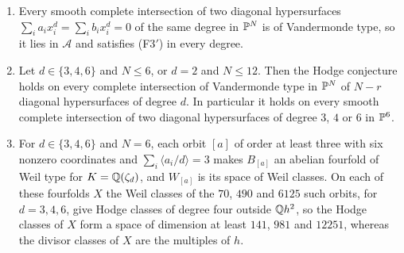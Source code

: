 \begin{corollary}\label{cor:twodiagonal}
\leavevmode
\begin{enumerate}[label=\textup{(\roman*)},leftmargin=2.6em,itemsep=2pt]
\item Every smooth complete intersection of two diagonal hypersurfaces
  $\sum_{i}a_{i}x_{i}^{d}=\sum_{i}b_{i}x_{i}^{d}=0$ of the same degree in
  $\mathbb{P}^{N}$ is of Vandermonde type, so it lies in $\mathcal{A}$ and
  satisfies \textup{(F3$'$)} in every degree.
\item Let $d\in\{3,4,6\}$ and $N\le6$, or $d=2$ and $N\le12$. Then the
  Hodge conjecture holds on every complete intersection of Vandermonde type
  in $\mathbb{P}^{N}$ of $N-r$ diagonal hypersurfaces of degree $d$. In particular
  it holds on every smooth complete intersection of two diagonal
  hypersurfaces of degree $3$, $4$ or $6$ in $\mathbb{P}^{6}$.
\item For $d\in\{3,4,6\}$ and $N=6$, each orbit $[a]$ of order at least
  three with six nonzero coordinates and $\sum_{i}\langle a_{i}/d\rangle=3$ makes $B_{[a]}$ an
  abelian fourfold of Weil type for $K=\mathbb{Q}(\zeta_{d})$, and $W_{[a]}$ is its
  space of Weil classes. On each of these fourfolds $X$ the Weil classes of
  the $70$, $490$ and $6125$ such orbits, for $d=3,4,6$, give Hodge classes of
  degree four outside $\mathbb{Q} h^{2}$, so the Hodge classes of $X$ form a space of
  dimension at least $141$, $981$ and $12251$, whereas the divisor classes of
  $X$ are the multiples of $h$.
\end{enumerate}
\end{corollary}


